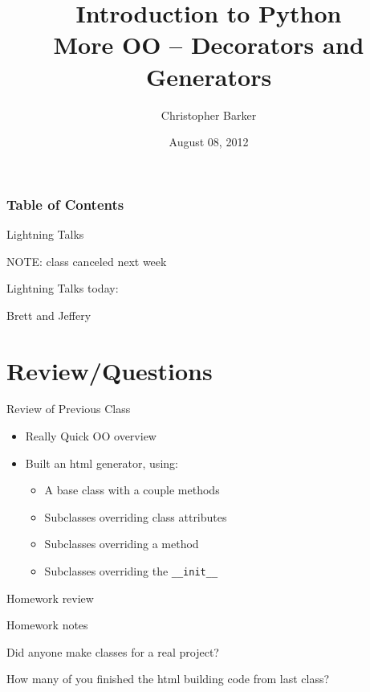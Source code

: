 \documentclass{beamer}
\title[Intro to Python: Week 7]{Introduction  to Python\\ More OO -- Decorators and Generators}
\author{Christopher Barker}
\institute{UW Continuing Education / Isilon}
\date{August 08, 2012}
\begin{document}
\begin{frame}
  \titlepage
\end{frame}

\begin{frame}
\frametitle{Table of Contents}
  \tableofcontents
\end{frame}

\begin{frame}{Lightning Talks}

{\centering

{\LARGE NOTE: class canceled next week}

\vfill
{\LARGE Lightning Talks today:  }

\vfill
{\Huge Brett and Jeffery}

\vfill
}
\end{frame}

\section{Review/Questions}

\begin{frame}[fragile]{Review of Previous Class}

\begin{itemize}
  \item Really Quick OO overview
  \item Built an html generator, using: 
  \begin{itemize}
    \item A base class with a couple methods
    \item Subclasses overriding class attributes
    \item Subclasses overriding a method
    \item Subclasses overriding the \verb|__init__|
  \end{itemize}
\end{itemize}

\end{frame}


\begin{frame}{Homework review}

\vfill
{\LARGE Homework notes }

\vfill
{\Large Did anyone make classes for a real project? }

\vfill
{\Large How many of you finished the html building code from last class? }
\vfill

\end{frame}
\end{document}
